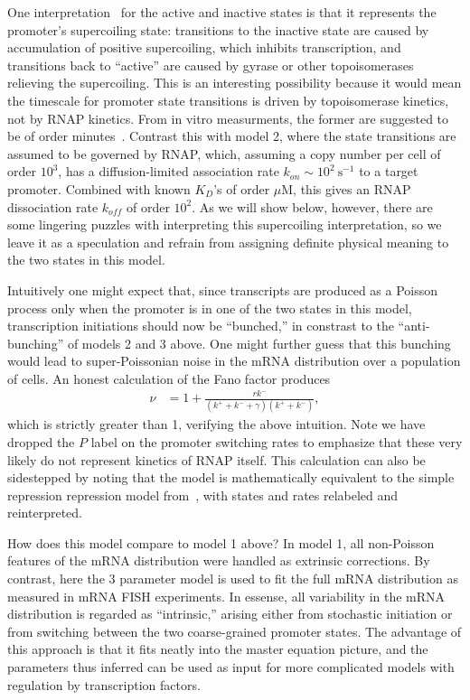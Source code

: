 \documentclass[12pt]{article}%
\begin{document}
One interpretation~\cite{Chong2014, Sevier2016} for the active
and inactive states is that it represents the promoter's
supercoiling state: transitions to the inactive state are caused
by accumulation of positive supercoiling, which inhibits
transcription, and transitions back to ``active'' are caused by
gyrase or other topoisomerases relieving the supercoiling. This
is an interesting possibility because it would mean the timescale
for promoter state transitions is driven by topoisomerase
kinetics, not by RNAP kinetics. From in vitro measurments, the
former are suggested to be of order minutes~\cite{Chong2014}.
Contrast this with model 2, where the state transitions are
assumed to be governed by RNAP, which, assuming a copy number per
cell of order $10^3$, has a diffusion-limited association rate
$k_{on} \sim 10^2~\text{s}^{-1}$ to a target promoter. Combined
with known $K_D$'s of order $\mu$M, this gives an RNAP
dissociation rate $k_{off}$ of order $10^2$. As we will show
below, however, there are some lingering puzzles with
interpreting this supercoiling interpretation, so we leave it as
a speculation and refrain from assigning definite physical
meaning to the two states in this model.

Intuitively one might expect that, since transcripts are produced
as a Poisson process only when the promoter is in one of the two
states in this model, transcription initiations should now be
``bunched,'' in constrast to the ``anti-bunching'' of models 2
and 3 above. One might further guess that this bunching would
lead to super-Poissonian noise in the mRNA distribution over a
population of cells. An honest calculation of the Fano factor produces
\begin{align}
\nu &= 1 + \frac{r k^-}{(k^+ + k^- + \gamma)(k^+ + k^-)},
\end{align}
which is strictly greater than 1, verifying the above intuition.
Note we have dropped the $P$ label on the promoter switching rates to
emphasize that these very likely do not represent kinetics of RNAP itself.
This calculation can also be sidestepped by noting that the model
is mathematically equivalent to the simple repression repression model
from~\cite{Jones2014}, with states and rates relabeled and reinterpreted.

How does this model compare to model 1 above?
In model 1, all non-Poisson features of the mRNA
distribution were handled as extrinsic corrections.
By contrast, here the 3 parameter model is used to fit the full
mRNA distribution as measured in mRNA FISH experiments.
In essense, all variability in the mRNA distribution is regarded
as ``intrinsic,'' arising either from stochastic initiation or
from switching between the two coarse-grained promoter states.
The advantage of this approach is that it fits neatly into the
master equation picture, and the parameters thus inferred can be used as
input for more complicated models with regulation by transcription factors.
\end{document}
